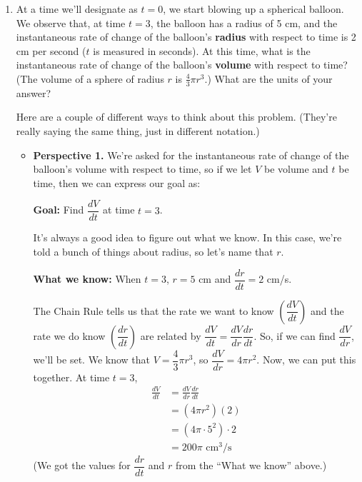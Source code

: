 \documentclass{article}
\newlength{\highlightwidth}
\newcommand{\highlight}[1]{\setlength{\highlightwidth}{\linewidth}%
  \addtolength{\highlightwidth}{-55pt}%
  \hspace{24pt}\begin{minipage}[t]{\highlightwidth} \setlength{\parskip}{8pt} #1 \end{minipage}\hspace{24pt}}
\begin{document}
\begin{enumerate}
\item 

  \begin{problem}[\stretch{2}]
    At a time we'll designate as $t = 0$, we start blowing up a spherical balloon. 
    We observe that, at time $t = 3$, the balloon has a
    radius of 5 cm, and the instantaneous rate of change of the balloon's
    \textbf{radius} with respect to time is 2 cm per second ($t$ is
    measured in seconds).  At this time, what is the instantaneous rate of
    change of the balloon's \textbf{volume} with respect to time?  (The
    volume of a sphere of radius $r$ is $\frac{4}{3} \pi r^3$.)  What are
    the units of your answer?    
  \end{problem}

  \begin{solution}
    Here are a couple of different ways to think about this problem.
    (They're really saying the same thing, just in different notation.)
    \begin{itemize}
    \item \textbf{Perspective 1.}  We're asked for the instantaneous rate
      of change of the balloon's volume with respect to time, so if we let
      $V$ be volume and $t$ be time, then we can express our goal as:

      \highlight{\textbf{Goal:} Find $\dfrac{dV}{dt}$ at time $t = 3$.}

      It's always a good idea to figure out what we know.  In this case,
      we're told a bunch of things about radius, so let's name that $r$.

      \highlight{\textbf{What we know:} When $t = 3$, $r = 5$ cm and
        $\dfrac{dr}{dt} = 2$ cm/s.}

      The Chain Rule tells us that the rate we want to know $\left(
        \dfrac{dV}{dt} \right)$ and the rate we do know $\left(
        \dfrac{dr}{dt} \right)$ are related by $\dfrac{dV}{dt} =
      \dfrac{dV}{dr} \dfrac{dr}{dt}$.  So, if we can find
      $\dfrac{dV}{dr}$, we'll be set.  We know that $V = \dfrac{4}{3} \pi
      r^3$, so $\dfrac{dV}{dr} = 4 \pi r^2$.  Now, we can put this
      together.  At time $t = 3$,
      \begin{align*}
        \frac{dV}{dt} &= \frac{dV}{dr} \frac{dr}{dt} \\
        &= (4 \pi r^2) (2) \\
        &= (4 \pi \cdot 5^2) \cdot 2 \\
        &= \boxed{200 \pi \text{ cm}^3/\text{s}}
      \end{align*}
      (We got the values for $\dfrac{dr}{dt}$ and $r$ from the ``What we
      know'' above.)


\end{itemize}
\end{solution}
\end{enumerate}
\end{document}

